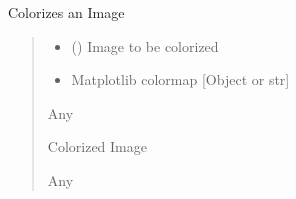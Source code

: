 \documentclass[letterpaper,10pt,english]{sphinxmanual}
\begin{document}
\begin{fulllineitems}
\label{\detokenize{Colorizer:Colorizer.colorize_complete_image}}
\pysigstartsignatures
{}
\pysigstopsignatures
\sphinxAtStartPar
Colorizes an Image
\begin{quote}\begin{description}
\begin{itemize}
\item {} 
\sphinxAtStartPar
{} () \textendash{} Image to be colorized

\item {} 
\sphinxAtStartPar
{} \textendash{} Matplotlib colormap {[}Object or str{]}

\end{itemize}

\sphinxAtStartPar
Any

\sphinxAtStartPar
Colorized Image

\sphinxAtStartPar
Any

\end{description}\end{quote}

\end{fulllineitems}

\end{document}
